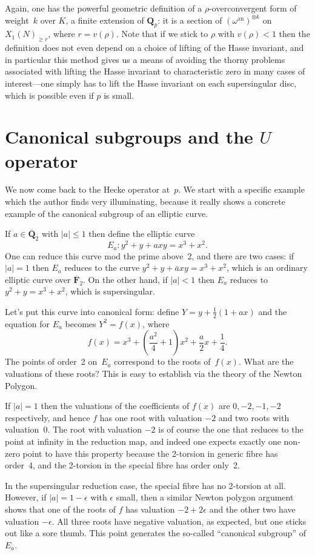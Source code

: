 \documentclass{article}
\newcommand{\F}{\mathbf F}
\newcommand{\Ftbar}{\overline{\F}_2}
\newcommand{\Q}{\mathbf{Q}}
\newcommand{\Qtbar}{\overline{\Q}_2}
\begin{document}
Again, one has the powerful geometric definition of a $\rho$-overconvergent
form of weight~$k$ over $K$, a finite extension of $\Q_p$:
it is a section of $(\omega^{\mathrm{an}})^{\otimes k}$
on $X_1(N)_{\geq r}$, where $r=v(\rho)$. Note that
if we stick to $\rho$ with $v(\rho)<1$ then the definition does not
even depend on a choice of lifting of the Hasse invariant, and in particular
this method gives us a means of avoiding the thorny problems associated
with lifting the Hasse invariant to characteristic zero in many cases
of interest---one simply has to lift the Hasse invariant on each
supersingular disc, which is possible even if $p$ is small.

\section{Canonical subgroups and the $U$ operator}

We now come back to the Hecke operator at~$p$. We start with a
specific example which the author finds very illuminating, because
it really shows a concrete example of the canonical subgroup of an
elliptic curve.

If $a\in\Qtbar$ with $|a|\leq1$ then define the elliptic curve
$$E_a:y^2+y+axy=x^3+x^2.$$
One can reduce this curve mod the prime above~2, and there are
two cases: if $|a|=1$ then $E_a$ reduces to the curve
$y^2+y+\bar{a}xy=x^3+x^2$,
which is an ordinary elliptic curve over $\Ftbar$. On the other hand,
if $|a|<1$ then $E_a$ reduces to $y^2+y=x^3+x^2$, which is supersingular.

Let's put this curve into canonical form: define $Y=y+
\frac{1}{2}\left(1+ax\right)$
and the equation for $E_a$ becomes $Y^2=f(x)$, where
$$f(x)=x^3+\left(\frac{a^2}{4}+1\right)x^2+\frac{a}{2}x+\frac{1}{4}.$$
The points of order~2 on~$E_a$ correspond to the roots of~$f(x)$.
What are the valuations of these roots? This is easy to establish
via the theory of the Newton Polygon.

If $|a|=1$ then the valuations of the coefficients of $f(x)$
are $0,-2,-1,-2$ respectively, and hence $f$ has one root with valuation $-2$
and two roots with valuation~0. The root with valuation $-2$
is of course the one that reduces to the point at infinity in the
reduction map, and indeed one expects exactly one non-zero point
to have this property because the 2-torsion in generic fibre has order~4,
and the 2-torsion in the special fibre has order only~2.

In the supersingular reduction case, the special fibre has no 2-torsion
at all. However, if $|a|=1-\epsilon$ with $\epsilon$ small, then
a similar Newton polygon argument shows that one of the roots of $f$
has valuation $-2+2\epsilon$ and the other two have valuation $-\epsilon$.
All three roots have negative valuation, as expected, but one sticks
out like a sore thumb. This point generates the so-called ``canonical
subgroup'' of $E_a$.
\end{document}
